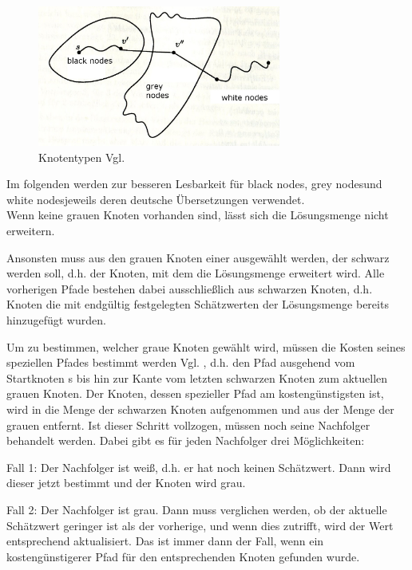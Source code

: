 \begin{figure}[h]
\centering
\includegraphics[width = 8cm]{./chapters/knotentypen.jpg}
\caption{Knotentypen 
Vgl. \cite[S.573 Abb. 8.19]{OttWid90}
 }
\label{a5}
\end{figure}


\parindent0pt Im folgenden werden zur besseren Lesbarkeit für \glqq black nodes\grqq, \glqq grey nodes\grqq und \glqq white nodes\grqq jeweils deren deutsche Übersetzungen verwendet. \\
 Wenn keine grauen Knoten vorhanden sind, lässt sich die Lösungsmenge nicht erweitern. 

\parindent0pt Ansonsten muss aus den grauen Knoten einer ausgewählt werden, der schwarz werden soll, d.h. der Knoten, mit dem die Lösungsmenge erweitert wird. Alle vorherigen Pfade bestehen dabei ausschließlich aus schwarzen Knoten, d.h. Knoten die mit endgültig festgelegten Schätzwerten der Lösungsmenge bereits hinzugefügt wurden.

\parindent0pt Um zu bestimmen, welcher graue Knoten gewählt wird, müssen die Kosten seines speziellen Pfades bestimmt werden 
Vgl. \cite[S.108,Z.8-12]{OttWid90}
, d.h. den Pfad ausgehend vom Startknoten s bis hin zur Kante vom letzten schwarzen Knoten zum aktuellen grauen Knoten. Der Knoten, dessen spezieller Pfad am kostengünstigsten ist, wird in die Menge der schwarzen Knoten aufgenommen und aus der Menge der grauen entfernt. Ist dieser Schritt vollzogen, müssen noch seine Nachfolger behandelt werden. Dabei gibt es für jeden Nachfolger drei Möglichkeiten:

\parindent0pt Fall 1: Der Nachfolger ist weiß, d.h. er hat noch keinen Schätzwert. Dann wird dieser jetzt bestimmt und der Knoten wird grau.

\parindent0pt Fall 2: Der Nachfolger ist grau. Dann muss verglichen werden, ob der aktuelle Schätzwert geringer ist als der vorherige, und wenn dies zutrifft, wird der Wert entsprechend aktualisiert. Das ist immer dann der Fall, wenn ein kostengünstigerer Pfad für den entsprechenden Knoten gefunden wurde.

